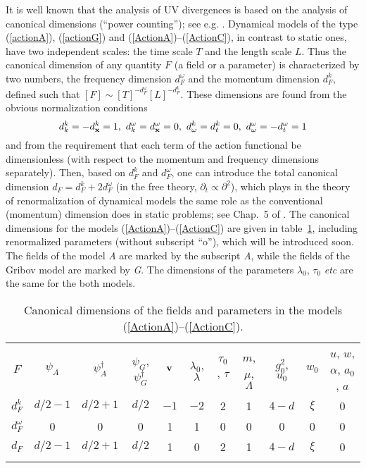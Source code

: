 \documentclass[12pt]{iopart}
\begin{document}
It is well known that the analysis of UV divergences is based on the analysis
of canonical dimensions (``power counting''); see e.g. \cite{Zinn,Book3}.
Dynamical models of the type (\ref{actionA}), (\ref{actionG}) and
(\ref{ActionA})--(\ref{ActionC}), in contrast to static ones, have
two independent scales: the time scale $T$ and the length scale $L$. Thus
the canonical dimension of any quantity $F$ (a field or a parameter) is
characterized by two numbers, the
frequency dimension $d_{F}^{\omega}$ and the momentum dimension $d_{F}^{k}$,
defined such that $[F] \sim [T]^{-d_{F}^{\omega}} [L]^{-d_{F}^{k}}$. These
dimensions are found from the obvious normalization conditions
\[ d_k^k=-d_{\bf x}^k=1,\ d_k^{\omega} =d_{\bf x}^{\omega }=0,\
d_{\omega }^k=d_t^k=0, \ d_{\omega }^{\omega }=-d_t^{\omega }=1 \]
and from the requirement
that each term of the action functional be dimensionless (with
respect to the momentum and frequency dimensions separately).
Then, based on $d_{F}^{k}$ and $d_{F}^{\omega}$,
one can introduce the total canonical dimension
$d_{F}=d_{F}^{k}+2d_{F}^{\omega}$ (in the free theory,
$\partial_{t}\propto\partial^{2}$), which plays in the theory of
renormalization of dynamical models the same role as
the conventional (momentum) dimension does in static problems;
see Chap.~5 of \cite{Book3}.
The canonical dimensions for the models (\ref{ActionA})--(\ref{ActionC})
are given in table~\ref{table1}, including renormalized parameters (without
subscript ``o''), which will be introduced soon.
The fields of the model {\it A} are marked by the subscript {\it A},
while the fields of the Gribov model are marked by {\it G}. The dimensions
of the parameters $\lambda_{0}$, $\tau_{0}$ {\it etc} are the same for the
both models.

\begin{table}
\caption{Canonical dimensions of the fields and parameters in the
models (\protect\ref{ActionA})--(\protect\ref{ActionC}).}
\label{table1}
\begin{tabular}{ccccccccccc}
\br
$F$ & $\psi_{A}$ & $\psi_{A}^{\dag}$ & $\psi_{G}$, $\psi_{G}^{\dag}$ &
$ {\bf v} $ &   $\lambda_{0}$, $\lambda$ &
$\tau_{0}$, $\tau$ &  $m$, $\mu$, $\Lambda$ & $g_{0}^{2}$, $u_{0}$ &
$w_{0}$ & $u$, $w$, $\alpha$, $a_{0}$, $a$ \\
\br
$d_{F}^{k}$ & $d/2-1$ & $d/2+1$ & $d/2$ & $-1$ & $-2$  & 2
& 1 &  $4-d$ & $\xi$ & 0 \\
\mr
$d_{F}^{\omega }$ & 0 & 0& 0 & 1 & 1 & 0 & 0 &  0 & 0 & 0 \\
\mr
$d_{F}$ & $d/2-1$ & $d/2+1$ &
$d/2$ & 1 & 0 & 2 & 1 &  $4-d$  & $\xi$ & 0 \\
\br
\end{tabular}
\end{table}
\end{document}

